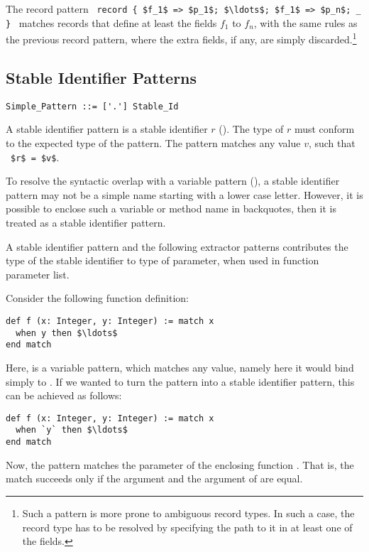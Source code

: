 The record pattern ~\lstinline!record { $f_1$ => $p_1$; $\ldots$; $f_1$ => $p_n$; _ }!~ matches records that define at least the fields $f_1$ to $f_n$, with the same rules as the previous record pattern, where the extra fields, if any, are simply discarded.\footnote{Such a pattern is more prone to ambiguous record types. In such a case, the record type has to be resolved by specifying the path to it in at least one of the fields.}






\subsection{Stable Identifier Patterns}
\label{sec:stable-identifier-patterns}

\syntax\begin{lstlisting}
Simple_Pattern ::= ['.'] Stable_Id
\end{lstlisting}

A stable identifier pattern is a stable identifier $r$ (). The type of $r$ must conform to the expected type of the pattern. The pattern matches any value $v$, such that ~\lstinline!$r$ = $v$!.

To resolve the syntactic overlap with a variable pattern (), a stable identifier pattern may not be a simple name starting with a lower case letter. However, it is possible to enclose such a variable or method name in backquotes, then it is treated as a stable identifier pattern. 

A stable identifier pattern and the following extractor patterns contributes the type of the stable identifier to type of parameter, when used in function parameter list. 

\example Consider the following function definition:
\begin{lstlisting}
def f (x: Integer, y: Integer) := match x
  when y then $\ldots$
end match
\end{lstlisting}
Here,  is a variable pattern, which matches any value, namely here it would bind simply to . If we wanted to turn the pattern into a stable identifier pattern, this can be achieved as follows:
\begin{lstlisting}
def f (x: Integer, y: Integer) := match x
  when `y` then $\ldots$
end match
\end{lstlisting}
Now, the pattern matches the  parameter of the enclosing function . That is, the match succeeds only if the  argument and the  argument of  are equal. 





